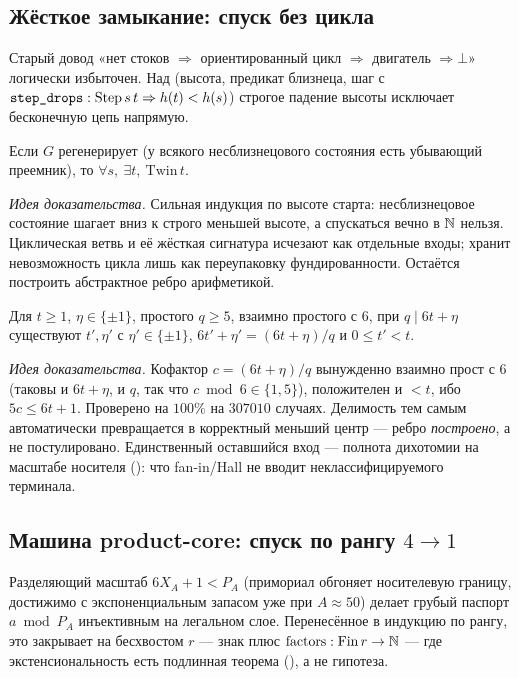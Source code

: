 \subsection{Жёсткое замыкание: спуск без цикла}

Старый довод «нет стоков $\Rightarrow$ ориентированный цикл $\Rightarrow$ двигатель $\Rightarrow\bot$»
логически избыточен. Над  (высота, предикат близнеца, шаг с
$\texttt{step\_drops}:\mathrm{Step}\,s\,t\Rightarrow h(t)<h(s)$) строгое падение высоты исключает
бесконечную цепь напрямую.

\begin{theorem}\label{thm:reaches_twin}
Если $G$ регенерирует (у всякого несблизнецового состояния есть убывающий преемник), то
$\forall s,\ \exists t,\ \mathrm{Twin}\,t$.
\end{theorem}

\emph{Идея доказательства.} Сильная индукция по высоте старта: несблизнецовое состояние шагает вниз к
строго меньшей высоте, а спускаться вечно в $\mathbb{N}$ нельзя. \green{} Циклическая ветвь и её жёсткая
сигнатура исчезают как отдельные входы;  хранит невозможность цикла лишь как
переупаковку фундированности. Остаётся построить абстрактное ребро арифметикой.

\begin{theorem}\label{thm:cofactor_is_center}
Для $t\ge1$, $\eta\in\{\pm1\}$, простого $q\ge5$, взаимно простого с $6$, при $q\mid 6t+\eta$
существуют $t',\eta'$ с $\eta'\in\{\pm1\}$, $6t'+\eta'=(6t+\eta)/q$ и $0\le t'<t$.
\end{theorem}

\emph{Идея доказательства.} Кофактор $c=(6t+\eta)/q$ вынужденно взаимно прост с $6$ (таковы и
$6t+\eta$, и $q$, так что $c\bmod6\in\{1,5\}$), положителен и $<t$, ибо $5c\le 6t+1$. \green{}
Проверено на $100\%$ на $307010$ случаях. Делимость тем самым автоматически превращается в
корректный меньший центр --- ребро \emph{построено}, а не постулировано. Единственный оставшийся вход
--- полнота дихотомии на масштабе носителя (): что fan-in/Hall
не вводит неклассифицируемого терминала.

\subsection{Машина product-core: спуск по рангу \texorpdfstring{$4\to1$}{4->1}}

Разделяющий масштаб $6X_A+1<P_A$ (примориал обгоняет носителевую границу, достижимо с экспоненциальным
запасом уже при $A\approx50$) делает грубый паспорт $a\bmod P_A$ инъективным на легальном слое.
Перенесённое в индукцию по рангу, это закрывает  на бесхвостом
 $r$ --- знак плюс $\mathrm{factors}:\mathrm{Fin}\,r\to\mathbb{N}$ --- где экстенсиональность
есть подлинная теорема (), а не гипотеза.

